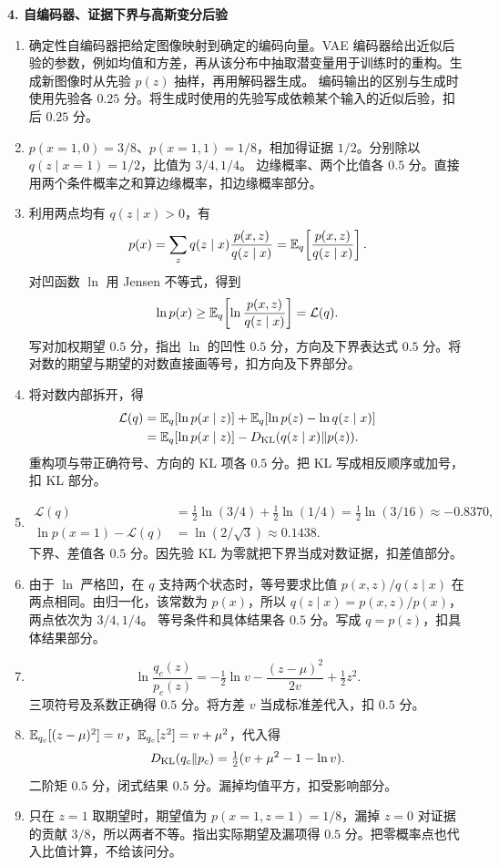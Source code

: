 \noindent\textbf{4. 自编码器、证据下界与高斯变分后验}

\begin{enumerate}[label=(\arabic*)]
\item 确定性自编码器把给定图像映射到确定的编码向量。VAE 编码器给出近似后验的参数，例如均值和方差，再从该分布中抽取潜变量用于训练时的重构。生成新图像时从先验 $p(z)$ 抽样，再用解码器生成。
编码输出的区别与生成时使用先验各 $0.25$ 分。将生成时使用的先验写成依赖某个输入的近似后验，扣后 $0.25$ 分。
\item $p(x=1,0)=3/8$、$p(x=1,1)=1/8$，相加得证据 $1/2$。分别除以 $q(z\mid x=1)=1/2$，比值为 $3/4,1/4$。
边缘概率、两个比值各 $0.5$ 分。直接用两个条件概率之和算边缘概率，扣边缘概率部分。
\item 利用两点均有 $q(z\mid x)>0$，有
\[
p(x)=\sum_zq(z\mid x)\frac{p(x,z)}{q(z\mid x)}
=\mathbb{E}_q\!\left[\frac{p(x,z)}{q(z\mid x)}\right].
\]
对凹函数 $\ln$ 用 Jensen 不等式，得到
\[
\ln p(x)\ge\mathbb{E}_q\!\left[\ln\frac{p(x,z)}{q(z\mid x)}\right]
=\mathcal L(q).
\]
写对加权期望 $0.5$ 分，指出 $\ln$ 的凹性 $0.5$ 分，方向及下界表达式 $0.5$ 分。将对数的期望与期望的对数直接画等号，扣方向及下界部分。
\item 将对数内部拆开，得
\begin{align*}
\mathcal L(q)&=\mathbb{E}_q[\ln p(x\mid z)]+\mathbb{E}_q[\ln p(z)-\ln q(z\mid x)]\\
&=\mathbb{E}_q[\ln p(x\mid z)]-D_{\mathrm{KL}}(q(z\mid x)\Vert p(z)).
\end{align*}
重构项与带正确符号、方向的 KL 项各 $0.5$ 分。把 KL 写成相反顺序或加号，扣 KL 部分。
\item
\begin{align*}
\mathcal L(q)&=\tfrac12\ln(3/4)+\tfrac12\ln(1/4)
=\tfrac12\ln(3/16)\approx-0.8370,\\
\ln p(x=1)-\mathcal L(q)&=\ln(2/\sqrt3)\approx0.1438.
\end{align*}
下界、差值各 $0.5$ 分。因先验 KL 为零就把下界当成对数证据，扣差值部分。
\item 由于 $\ln$ 严格凹，在 $q$ 支持两个状态时，等号要求比值 $p(x,z)/q(z\mid x)$ 在两点相同。由归一化，该常数为 $p(x)$，所以 $q(z\mid x)=p(x,z)/p(x)$，两点依次为 $3/4,1/4$。
等号条件和具体结果各 $0.5$ 分。写成 $q=p(z)$，扣具体结果部分。
\item
\[
\ln\frac{q_c(z)}{p_c(z)}=-\tfrac12\ln v-\frac{(z-\mu)^2}{2v}+\tfrac12z^2.
\]
三项符号及系数正确得 $0.5$ 分。将方差 $v$ 当成标准差代入，扣 $0.5$ 分。
\item $\mathbb{E}_{q_c}[(z-\mu)^2]=v$，$\mathbb{E}_{q_c}[z^2]=v+\mu^2$，代入得
\[
D_{\mathrm{KL}}(q_c\Vert p_c)=\tfrac12(v+\mu^2-1-\ln v).
\]
二阶矩 $0.5$ 分，闭式结果 $0.5$ 分。漏掉均值平方，扣受影响部分。
\item 只在 $z=1$ 取期望时，期望值为 $p(x=1,z=1)=1/8$，漏掉 $z=0$ 对证据的贡献 $3/8$，所以两者不等。指出实际期望及漏项得 $0.5$ 分。把零概率点也代入比值计算，不给该问分。
\end{enumerate}

